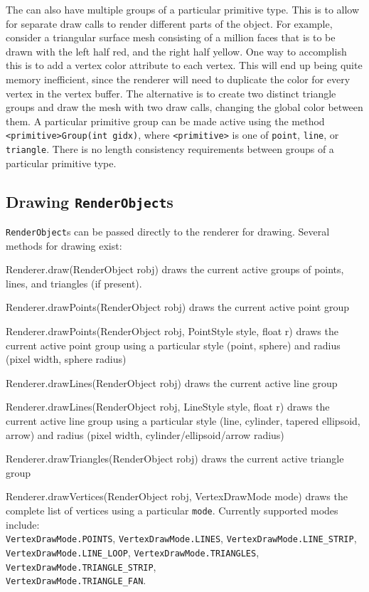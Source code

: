 \documentclass{article}
\let\olditem\item
\newcommand{\lstitem}[2][]{\olditem[\texttt{#1}]\mbox{}\newline#2}
\newenvironment{lstdescription}{%
   \begin{description}[nolistsep]
   \let\item\lstitem
}{\end{description}}
\begin{document}
The  can also have multiple groups of a particular primitive type.  This
is to allow for separate draw calls to render different parts of the object.  For example, consider
a triangular surface mesh consisting of a million faces that is to be drawn with the left half red, 
and the right half yellow.  One way to accomplish this is to add a vertex color attribute to each vertex.  
This will end up being quite memory inefficient, since the renderer will need to duplicate the color
for every vertex in the vertex buffer.  The alternative is to create two distinct triangle groups
and draw the mesh with two draw calls, changing the global color between them.  A particular primitive
group can be made active using the method \lstinline{<primitive>Group(int gidx)}, 
where \lstinline{<primitive>} is one of \lstinline{point}, \lstinline{line}, or \lstinline{triangle}.
There is no length consistency requirements between groups of a particular primitive type.

\subsection{Drawing \texttt{RenderObject}s}

\lstinline{RenderObject}s can be passed directly to the renderer for drawing.  Several methods for
drawing exist:
\begin{lstdescription}
   \item[Renderer.draw(RenderObject robj)] draws the current active groups of points, lines, and
   triangles (if present).
   \item[Renderer.drawPoints(RenderObject robj)] draws the current active point group
   \item[Renderer.drawPoints(RenderObject robj, PointStyle style, float r)] draws the current 
   active point group using a particular style (point, sphere) and radius (pixel width, sphere radius)
   \item[Renderer.drawLines(RenderObject robj)] draws the current active line group
   \item[Renderer.drawLines(RenderObject robj, LineStyle style, float r)] draws the current 
   active line group using a particular style (line, cylinder, tapered ellipsoid, arrow) and radius
   (pixel width, cylinder/ellipsoid/arrow radius)
   \item[Renderer.drawTriangles(RenderObject robj)] draws the current active triangle group
   \item[Renderer.drawVertices(RenderObject robj, VertexDrawMode mode)] draws the complete
      list of vertices using a particular \lstinline{mode}.  Currently supported modes
      include:\\
      \lstinline{VertexDrawMode.POINTS}, \lstinline{VertexDrawMode.LINES}, \lstinline{VertexDrawMode.LINE_STRIP},\\
      \lstinline{VertexDrawMode.LINE_LOOP}, \lstinline{VertexDrawMode.TRIANGLES}, \lstinline{VertexDrawMode.TRIANGLE_STRIP},\\
      \lstinline{VertexDrawMode.TRIANGLE_FAN}.
\end{lstdescription}
\end{document}
